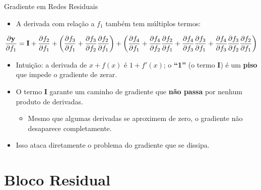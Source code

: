 \documentclass[aspectratio=169,xcolor=dvipsnames]{beamer}
\begin{document}
\begin{frame}{Gradiente em Redes Residuais}
\begin{itemize}
    \item A derivada com relação a $f_1$ também tem múltiplos termos:
\end{itemize}
\begin{equation*}
\small
    \frac{\partial \mathbf{y}}{\partial f_1} = \mathbf{I} + \frac{\partial f_2}{\partial f_1} + \left(\frac{\partial f_3}{\partial f_1} + \frac{\partial f_3}{\partial f_2}\frac{\partial f_2}{\partial f_1}\right) + \left(\frac{\partial f_4}{\partial f_1} + \frac{\partial f_4}{\partial f_2}\frac{\partial f_2}{\partial f_1} + \frac{\partial f_4}{\partial f_3}\frac{\partial f_3}{\partial f_1} + \frac{\partial f_4}{\partial f_3}\frac{\partial f_3}{\partial f_2}\frac{\partial f_2}{\partial f_1}\right)
\end{equation*}
\begin{itemize}
    \item Intuição: a derivada de $x + f(x)$ é $1 + f'(x)$; o \textbf{``1''} (o termo $\mathbf{I}$) é um \textbf{piso} que impede o gradiente de zerar.
    \item O termo $\mathbf{I}$ garante um caminho de gradiente que \textbf{não passa} por nenhum produto de derivadas.
    \begin{itemize}
        \item Mesmo que algumas derivadas se aproximem de zero, o gradiente não desaparece completamente.
    \end{itemize}
    \item Isso ataca diretamente o problema do gradiente que se dissipa.
\end{itemize}
\end{frame}

\section{Bloco Residual}
\end{document}
